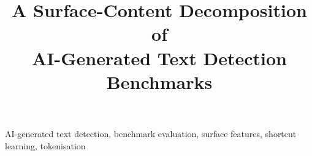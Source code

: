 \documentclass[conference,a4paper]{IEEEtran}
\newif\ifblind
\begin{document}
\title{A Surface-Content Decomposition of\\AI-Generated Text Detection Benchmarks}

\ifblind
  \author{\IEEEauthorblockN{Anonymous Author(s)}
  \IEEEauthorblockA{Affiliation withheld for double-blind review}}
\else
  \author{
  }
\fi

\maketitle

\begin{abstract}

\end{abstract}

\begin{IEEEkeywords}
AI-generated text detection, benchmark evaluation, surface features, shortcut learning, tokenisation
\end{IEEEkeywords}









\end{document}
